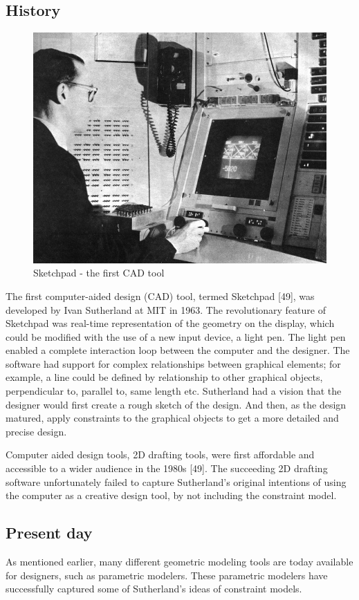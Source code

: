 \subsection{History}
\begin{figure}
  \includegraphics[width=350pt]{graphics/sketchpad.jpg}
  \caption{Sketchpad - the first CAD tool}
  \label{fig:sketchpad}
\end{figure}
The first computer-aided design (CAD) tool, termed Sketchpad [49], was developed by Ivan Sutherland at MIT in 1963. The revolutionary feature of Sketchpad was real-time representation of the geometry on the display, which could be modified with the use of a new input device, a light pen. The light pen enabled a complete interaction loop between the computer and the designer. The software had support for complex relationships between graphical elements; for example, a line could be defined by relationship to other graphical objects, perpendicular to, parallel to, same length etc. Sutherland had a vision that the designer would first create a rough sketch of the design. And then, as the design matured, apply constraints to the graphical objects to get a more detailed and precise design. 

Computer aided design tools, 2D drafting tools, were first affordable and accessible to a wider audience in the 1980s [49]. The succeeding 2D drafting software unfortunately failed to capture Sutherland’s original intentions of using the computer as a creative design tool, by not including the constraint model. 

\subsection{Present day}
As mentioned earlier, many different geometric modeling tools are today available for designers, such as parametric modelers. These parametric modelers have successfully captured some of Sutherland’s ideas of constraint models. 

